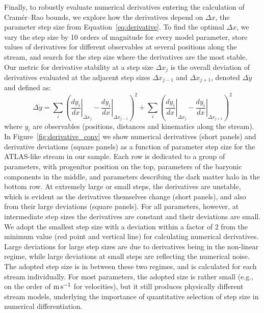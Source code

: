 \documentclass[modern]{aastex61}
\begin{document}
Finally, to robustly evaluate numerical derivatives entering the calculation of Cram\' er--Rao bounds, we explore how the derivatives depend on $\Delta x$, the parameter step size from Equation~\ref{eq:derivative}.
To find the optimal $\Delta x$, we vary the step size by 10 orders of magnitude for every model parameter, store values of derivatives for different observables at several positions along the stream, and search for the step size where the derivatives are the most stable.
Our metric for derivative stability at a step size $\Delta x_j$ is the overall deviation of derivatives evaluated at the adjacent step sizes $\Delta x_{j-1}$ and $\Delta x_{j+1}$, denoted $\Delta \dot{y}$ and defined as:
\begin{equation}
\Delta \dot{y} = \sum_i \left(\left.\frac{dy_i}{dx}\right\vert_{\Delta x_j} - \left.\frac{dy_i}{dx}\right\vert_{\Delta x_{j-1}}\right)^2 + \sum_i \left(\left.\frac{dy_i}{dx}\right\vert_{\Delta x_j} - \left.\frac{dy_i}{dx}\right\vert_{\Delta x_{j+1}}\right)^2
\label{eq:stability}
\end{equation}
where $y_i$ are observables (positions, distances and kinematics along the stream).
In Figure~\ref{fig:derivative_conv} we show numerical derivatives (short panels) and derivative deviations (square panels) as a function of parameter step size for the ATLAS-like stream in our sample.
Each row is dedicated to a group of parameters, with progenitor position on the top, parameters of the baryonic components in the middle, and parameters describing the dark matter halo in the bottom row.
At extremely large or small steps, the derivatives are unstable, which is evident as the derivatives themselves change (short panels), and also from their large deviations (square panels).
For all parameters, however, at intermediate step sizes the derivatives are constant and their deviations are small.
We adopt the smallest step size with a deviation within a factor of 2 from the minimum value (red point and vertical line) for calculating numerical derivatives.
Large deviations for large step sizes are due to derivatives being in the non-linear regime, while large deviations at small steps are reflecting the numerical noise.
The adopted step size is in between these two regimes, and is calculated for each stream individually.
For most parameters, the adopted size is rather small (e.g., on the order of $\rm m\,s^{-1}$ for velocities), but it still produces physically different stream models, underlying the importance of quantitative selection of step size in numerical differentiation.
\end{document}
